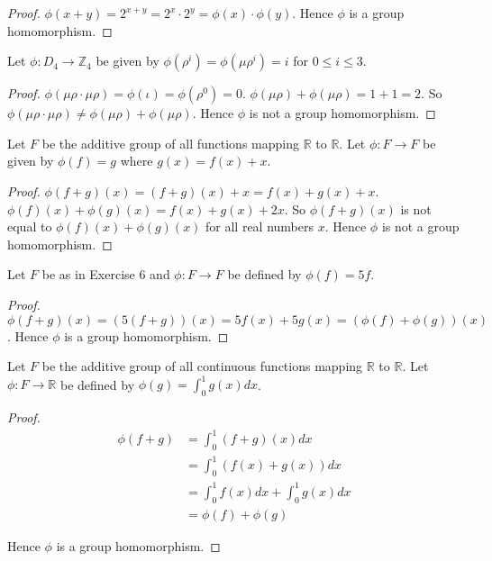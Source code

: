 \begin{proof}
    $\phi(x + y) = {2}^{x+y} = {2}^{x}\cdot {2}^{y} = \phi(x)\cdot\phi(y)$. Hence $\phi$ is a group homomorphism.
\end{proof}

\newpage
\begin{exercise}
    Let $\phi: D_{4} \to \mathbb{Z}_{4}$ be given by $\phi(\rho^{i}) = \phi(\mu\rho^{i}) = i$ for $0\leq i\leq 3$.
\end{exercise}

\begin{proof}
    $\phi(\mu\rho\cdot\mu\rho) = \phi(\iota) = \phi(\rho^{0}) = 0$. $\phi(\mu\rho) + \phi(\mu\rho) = 1 + 1 = 2$. So $\phi(\mu\rho\cdot\mu\rho) \ne \phi(\mu\rho) + \phi(\mu\rho)$. Hence $\phi$ is not a group homomorphism.
\end{proof}

\newpage
\begin{exercise}
    Let $F$ be the additive group of all functions mapping $\mathbb{R}$ to $\mathbb{R}$. Let $\phi: F \to F$ be given by $\phi(f) = g$ where $g(x) = f(x) + x$.
\end{exercise}

\begin{proof}
    $\phi(f + g)(x) = (f + g)(x) + x = f(x) + g(x) + x$. $\phi(f)(x) + \phi(g)(x) = f(x) + g(x) + 2x$. So $\phi(f + g)(x)$ is not equal to $\phi(f)(x) + \phi(g)(x)$ for all real numbers $x$. Hence $\phi$ is not a group homomorphism.
\end{proof}

\newpage
\begin{exercise}
    Let $F$ be as in Exercise 6 and $\phi: F \to F$ be defined by $\phi(f) = 5f$.
\end{exercise}

\begin{proof}
    $\phi(f + g)(x) = (5(f + g))(x) = 5f(x) + 5g(x) = (\phi(f) + \phi(g))(x)$. Hence $\phi$ is a group homomorphism.
\end{proof}

\newpage
\begin{exercise}
    Let $F$ be the additive group of all continuous functions mapping $\mathbb{R}$ to $\mathbb{R}$. Let $\phi: F\to \mathbb{R}$ be defined by $\phi(g) = \int^{1}_{0}g(x)dx$.
\end{exercise}

\begin{proof}
    \begin{align*}
        \phi(f + g) & = \int^{1}_{0}(f + g)(x)dx                \\
                    & = \int^{1}_{0}(f(x) + g(x))dx             \\
                    & = \int^{1}_{0}f(x)dx + \int^{1}_{0}g(x)dx \\
                    & = \phi(f) + \phi(g)
    \end{align*}

    Hence $\phi$ is a group homomorphism.
\end{proof}

